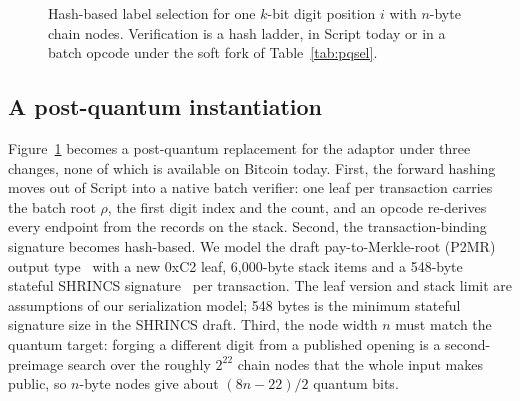 \documentclass[11pt]{article}
\begin{document}
\begin{figure}[p]
\caption{Hash-based label selection for one $k$-bit digit position $i$ with
$n$-byte chain nodes. Verification is a hash ladder, in Script today or in a batch opcode under the
soft fork of Table~\ref{tab:pqsel}.}
\label{fig:hashseq}
\end{figure}

\subsection{A post-quantum instantiation}\label{app:pqsel}

Figure~\ref{fig:hashseq} becomes
a post-quantum replacement for the adaptor under three changes, none of which
is available on Bitcoin today. First, the forward hashing moves out of Script
into a native batch verifier: one leaf per transaction carries the batch root
$\rho$, the first digit index and the count, and an opcode re-derives every
endpoint from the records on the stack. Second, the transaction-binding
signature becomes hash-based. We model the draft pay-to-Merkle-root (P2MR) output
type~\cite{bip360} with a new 0xC2 leaf, 6{,}000-byte stack items and a
548-byte stateful SHRINCS signature~\cite{shrincs} per transaction.
The leaf version and stack limit are assumptions of our serialization model;
548 bytes is the minimum stateful signature size in the SHRINCS draft. Third, the node width $n$ must match the quantum
target: forging a different digit from a published opening is a second-preimage
search over the roughly $2^{22}$ chain nodes that the whole input makes
public, so $n$-byte nodes give about $(8n-22)/2$ quantum bits.
\end{document}
